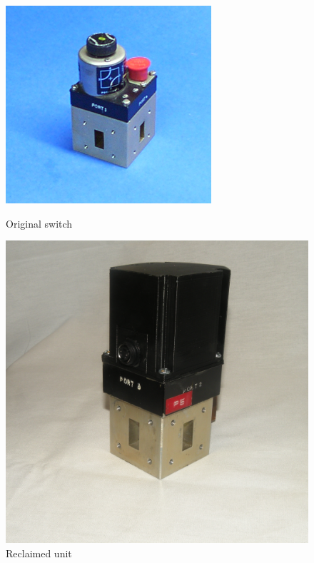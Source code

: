 \documentclass[12pt]{article}
\begin{document}
\begin{figure}[tb]
  \centering
  \begin{minipage}[b]{0.4\textwidth}
    \includegraphics[width=\textwidth]{wr-90-s1.jpg}
    \caption{\label{f_wg_switch_orig}Original switch}  
  \end{minipage}
  \begin{minipage}[b]{0.4\textwidth}
    \includegraphics[width=\textwidth]{WGFinal.jpg}
    \caption{\label{f_wg_switch_new}Reclaimed unit}      
  \end{minipage}
  \end{figure}
\end{document}
